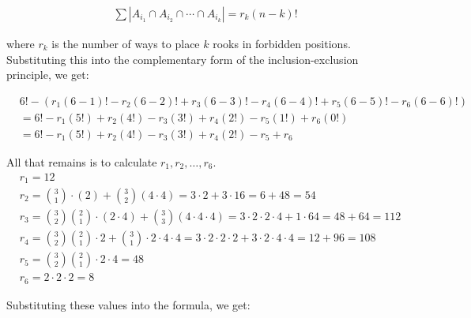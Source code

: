\documentclass{report}
\begin{document}
{\begin{enumerate}
{              \begin{align*}
                  \sum |A_{i_1} \cap A_{i_2} \cap \cdots \cap A_{i_k}| = r_k (n - k)!
              \end{align*}

              where $r_k$ is the number of ways to place $k$ rooks in forbidden positions. \\

              Substituting this into the complementary form of the inclusion-exclusion
              principle, we get:

              \begin{align*}
                   & 6! - (r_1(6 - 1)! - r_2(6 - 2)! + r_3(6 - 3)! - r_4(6 - 4)! + r_5(6 - 5)! - r_6(6 - 6)!) \\
                   & = 6! - r_1(5!) + r_2(4!) - r_3(3!) + r_4(2!) - r_5(1!) + r_6(0!)                         \\
                   & = 6! - r_1(5!) + r_2(4!) - r_3(3!) + r_4(2!) - r_5 + r_6
              \end{align*}

              All that remains is to calculate $r_1, r_2, \dots, r_6$. \\

              \begin{align*}
                   & r_1 = 12                                                                                                                                         \\
                   & r_2 = \binom{3}{1}\cdot (2)+ \binom{3}{2} (4\cdot 4) = 3 \cdot 2 + 3 \cdot 16 = 6 + 48 = 54                                                      \\
                   & r_3 = \binom{3}{2} \binom{2}{1} \cdot (2 \cdot 4) + \binom{3}{3} (4 \cdot 4 \cdot 4) = 3\cdot 2 \cdot 2 \cdot 4 + 1\cdot 64 = 48+64= 112         \\
                   & r_4 = \binom{3}{2} \binom{2}{1} \cdot 2 + \binom{3}{1} \cdot 2 \cdot 4 \cdot 4 = 3\cdot 2\cdot 2\cdot 2 + 3\cdot 2\cdot 4\cdot 4 = 12 + 96 = 108 \\
                   & r_5 = \binom{3}{2} \binom{2}{1} \cdot 2 \cdot 4 = 48                                                                                             \\
                   & r_6 = 2 \cdot 2 \cdot 2 = 8
              \end{align*}

              Substituting these values into the formula, we get:

}
\end{enumerate}}
\end{document}
